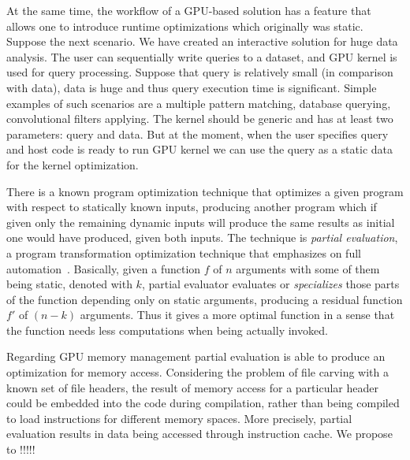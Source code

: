 \documentclass[sigplan,review,anonymous]{acmart}\settopmatter{printfolios=true,printccs=false,printacmref=false}
\newcommand\question[1]{{\color{violet}#1}}
\begin{document}
At the same time, the workflow of a GPU-based solution has a feature that allows one to introduce runtime optimizations which originally was static.
Suppose the next scenario.
We have created an interactive solution for huge data analysis.
The user can sequentially write queries to a dataset, and GPU kernel is used for query processing.
Suppose that query is relatively small (in comparison with data), data is huge and thus query execution time is significant.
Simple examples of such scenarios are a multiple pattern matching, database querying, convolutional filters applying.
The kernel should be generic and has at least two parameters: query and data.
But at the moment, when the user specifies query and host code is ready to run GPU kernel we can use the query as a static data for the kernel optimization.

There is a known program optimization technique that optimizes a given program with respect to statically known inputs, producing another program which if given only the remaining dynamic inputs will produce the same results as initial one would have produced, given both inputs.
\question{The technique is \textit{partial evaluation}, a program transformation optimization technique that emphasizes on full automation~\cite{Jones:1993:PEA:153676}.
Basically, given a function $f$ of $n$ arguments with some of them being static, denoted with $k$, partial evaluator evaluates or \textit{specializes} those parts of the function depending only on static arguments, producing a residual function $f'$ of $(n-k)$ arguments.
Thus it gives a more optimal function in a sense that the function needs less computations when being actually invoked.}

Regarding GPU memory management partial evaluation is able to produce an optimization for memory access. 
Considering the problem of file carving with a known set of file headers, the result of memory access for a particular header could be embedded into the code during compilation, rather than being compiled to load instructions for different memory spaces. 
More precisely, partial evaluation results in data being accessed through instruction cache. 
We propose to !!!!!

\end{document}

